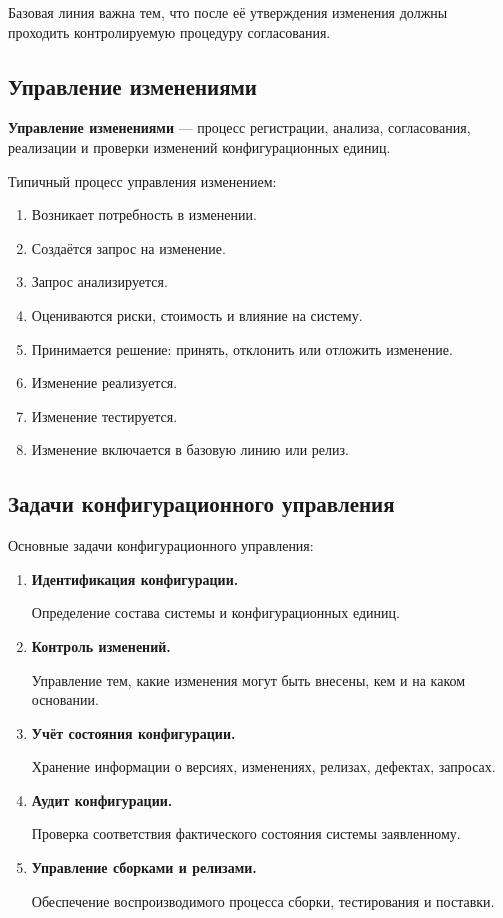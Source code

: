 \documentclass[12pt,a4paper]{article}
\begin{document}
Базовая линия важна тем, что после её утверждения изменения должны проходить контролируемую процедуру согласования.

\subsection{Управление изменениями}

\textbf{Управление изменениями} --- процесс регистрации, анализа, согласования, реализации и проверки изменений конфигурационных единиц.

Типичный процесс управления изменением:

\begin{enumerate}
    \item Возникает потребность в изменении.
    \item Создаётся запрос на изменение.
    \item Запрос анализируется.
    \item Оцениваются риски, стоимость и влияние на систему.
    \item Принимается решение: принять, отклонить или отложить изменение.
    \item Изменение реализуется.
    \item Изменение тестируется.
    \item Изменение включается в базовую линию или релиз.
\end{enumerate}

\subsection{Задачи конфигурационного управления}

Основные задачи конфигурационного управления:

\begin{enumerate}
    \item \textbf{Идентификация конфигурации.}

    Определение состава системы и конфигурационных единиц.

    \item \textbf{Контроль изменений.}

    Управление тем, какие изменения могут быть внесены, кем и на каком основании.

    \item \textbf{Учёт состояния конфигурации.}

    Хранение информации о версиях, изменениях, релизах, дефектах, запросах.

    \item \textbf{Аудит конфигурации.}

    Проверка соответствия фактического состояния системы заявленному.

    \item \textbf{Управление сборками и релизами.}

    Обеспечение воспроизводимого процесса сборки, тестирования и поставки.
\end{enumerate}
\end{document}
